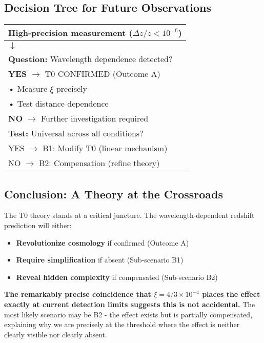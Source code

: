 \documentclass[12pt,a4paper]{article}
\theoremstyle{definition}
\begin{document}
	\subsection{Decision Tree for Future Observations}
	
	\begin{center}
		\begin{tabular}{l}
			\textbf{High-precision measurement} ($\Delta z/z < 10^{-6}$) \\
			\midrule
			$\downarrow$ \\
			\textbf{Question:} Wavelength dependence detected? \\
			\midrule
			\textbf{YES} $\rightarrow$ T0 CONFIRMED (Outcome A) \\
			\hspace{1cm} • Measure $\xi$ precisely \\
			\hspace{1cm} • Test distance dependence \\
			\midrule
			\textbf{NO} $\rightarrow$ Further investigation required \\
			\hspace{1cm} \textbf{Test:} Universal across all conditions? \\
			\hspace{2cm} YES $\rightarrow$ B1: Modify T0 (linear mechanism) \\
			\hspace{2cm} NO $\rightarrow$ B2: Compensation (refine theory)
		\end{tabular}
	\end{center}
	
	\subsection{Conclusion: A Theory at the Crossroads}
	
	The T0 theory stands at a critical juncture. The wavelength-dependent redshift prediction will either:
	
	\begin{itemize}
		\item \textbf{Revolutionize cosmology} if confirmed (Outcome A)
		\item \textbf{Require simplification} if absent (Sub-scenario B1)
		\item \textbf{Reveal hidden complexity} if compensated (Sub-scenario B2)
	\end{itemize}
	
	\begin{important}[title=Critical Insight: The Coincidence Problem]
		\textbf{The remarkably precise coincidence that $\xi = 4/3 \times 10^{-4}$ places the effect exactly at current detection limits suggests this is not accidental.} The most likely scenario may be B2 - the effect exists but is partially compensated, explaining why we are precisely at the threshold where the effect is neither clearly visible nor clearly absent.
	\end{important}
	
\end{document}

